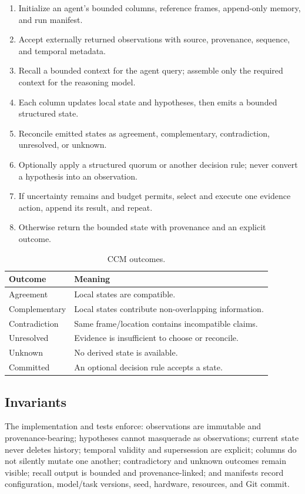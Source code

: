 \begin{enumerate}
  \item Initialize an agent's bounded columns, reference frames, append-only memory, and run manifest.
  \item Accept externally returned observations with source, provenance, sequence, and temporal metadata.
  \item Recall a bounded context for the agent query; assemble only the required context for the reasoning model.
  \item Each column updates local state and hypotheses, then emits a bounded structured state.
  \item Reconcile emitted states as agreement, complementary, contradiction, unresolved, or unknown.
  \item Optionally apply a structured quorum or another decision rule; never convert a hypothesis into an observation.
  \item If uncertainty remains and budget permits, select and execute one evidence action, append its result, and repeat.
  \item Otherwise return the bounded state with provenance and an explicit outcome.
\end{enumerate}

\begin{table}[t]
\centering
\caption{CCM outcomes.}
\label{alg:ccm}
\begin{tabular}{ll}
\toprule
Outcome & Meaning \\
\midrule
Agreement & Local states are compatible. \\
Complementary & Local states contribute non-overlapping information. \\
Contradiction & Same frame/location contains incompatible claims. \\
Unresolved & Evidence is insufficient to choose or reconcile. \\
Unknown & No derived state is available. \\
Committed & An optional decision rule accepts a state. \\
\bottomrule
\end{tabular}
\end{table}

\subsection{Invariants}

The implementation and tests enforce: observations are immutable and provenance-bearing; hypotheses cannot masquerade as observations; current state never deletes history; temporal validity and supersession are explicit; columns do not silently mutate one another; contradictory and unknown outcomes remain visible; recall output is bounded and provenance-linked; and manifests record configuration, model/task versions, seed, hardware, resources, and Git commit.
